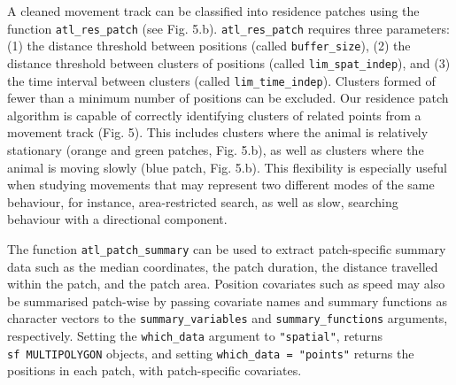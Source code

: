 \documentclass[10pt,paper=a4,headings=standardclasses
]{scrartcl}
\begin{document}
A cleaned movement track can be classified into residence patches using the function \texttt{atl\_res\_patch} (see Fig. 5.b).
\texttt{atl\_res\_patch} requires three parameters: (1) the distance threshold between positions (called \texttt{buffer\_size}), (2) the distance threshold between clusters of positions (called \texttt{lim\_spat\_indep}), and (3) the time interval between clusters (called \texttt{lim\_time\_indep}).
Clusters formed of fewer than a minimum number of positions can be excluded.
Our residence patch algorithm is capable of correctly identifying clusters of related points from a movement track (Fig. 5).
This includes clusters where the animal is relatively stationary (orange and green patches, Fig. 5.b), as well as clusters where the animal is moving slowly (blue patch, Fig. 5.b).
This flexibility is especially useful when studying movements that may represent two different modes of the same behaviour, for instance, area-restricted search, as well as slow, searching behaviour with a directional component.

The function \texttt{atl\_patch\_summary} can be used to extract patch-specific summary data such as the median coordinates, the patch duration, the distance travelled within the patch, and the patch area.
Position covariates such as speed may also be summarised patch-wise by passing covariate names and  summary functions as character vectors to the \texttt{summary\_variables} and \texttt{summary\_functions} arguments, respectively.
Setting the \texttt{which\_data} argument to \texttt{"spatial"}, returns \texttt{sf\ MULTIPOLYGON} objects, and setting \texttt{which\_data = "points"} returns the positions in each patch, with patch-specific covariates.
\end{document}
